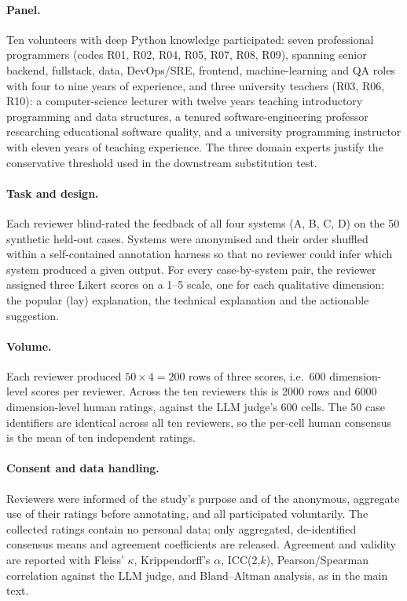 \documentclass[sageh]{sagej}
\begin{document}
\paragraph{Panel.} Ten volunteers with deep Python knowledge participated: seven professional programmers (codes R01, R02, R04, R05, R07, R08, R09), spanning senior backend, fullstack, data, DevOps/SRE, frontend, machine-learning and QA roles with four to nine years of experience, and three university teachers (R03, R06, R10): a computer-science lecturer with twelve years teaching introductory programming and data structures, a tenured software-engineering professor researching educational software quality, and a university programming instructor with eleven years of teaching experience. The three domain experts justify the conservative threshold used in the downstream substitution test.

\paragraph{Task and design.} Each reviewer blind-rated the feedback of all four systems (A, B, C, D) on the 50 synthetic held-out cases. Systems were anonymised and their order shuffled within a self-contained annotation harness so that no reviewer could infer which system produced a given output. For every case-by-system pair, the reviewer assigned three Likert scores on a 1--5 scale, one for each qualitative dimension: the popular (lay) explanation, the technical explanation and the actionable suggestion.

\paragraph{Volume.} Each reviewer produced $50\times4=200$ rows of three scores, i.e.\ 600 dimension-level scores per reviewer. Across the ten reviewers this is 2000 rows and 6000 dimension-level human ratings, against the LLM judge's 600 cells. The 50 case identifiers are identical across all ten reviewers, so the per-cell human consensus is the mean of ten independent ratings.

\paragraph{Consent and data handling.} Reviewers were informed of the study's purpose and of the anonymous, aggregate use of their ratings before annotating, and all participated voluntarily. The collected ratings contain no personal data; only aggregated, de-identified consensus means and agreement coefficients are released. Agreement and validity are reported with Fleiss' $\kappa$, Krippendorff's $\alpha$, ICC(2,$k$), Pearson/Spearman correlation against the LLM judge, and Bland--Altman analysis, as in the main text.



\end{document}
